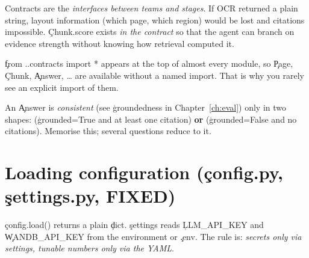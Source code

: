 \begin{why}
Contracts are the \emph{interfaces between teams and stages}. If OCR returned a plain string, layout information (which page, which region) would be lost and citations impossible. \c{Chunk.score} exists \emph{in the contract} so that the agent can branch on evidence strength without knowing how retrieval computed it.
\end{why}
\begin{gotcha}
\c{from ..contracts import *} appears at the top of almost every module, so \c{Page}, \c{Chunk}, \c{Answer}, \dots{} are available without a named import. That is why you rarely see an explicit import of them.
\end{gotcha}
\begin{tip}
An \c{Answer} is \emph{consistent} (see \c{groundedness} in Chapter~\ref{ch:eval}) only in two shapes: (\c{grounded=True} and at least one citation) \textbf{or} (\c{grounded=False} and no citations). Memorise this; several questions reduce to it.
\end{tip}

\section{Loading configuration (\c{config.py}, \c{settings.py}, FIXED)}
\c{config.load()} returns a plain \c{dict}. \c{settings} reads \c{LLM\_API\_KEY} and \c{WANDB\_API\_KEY} from the environment or \c{.env}. The rule is: \emph{secrets only via settings, tunable numbers only via the YAML}.

